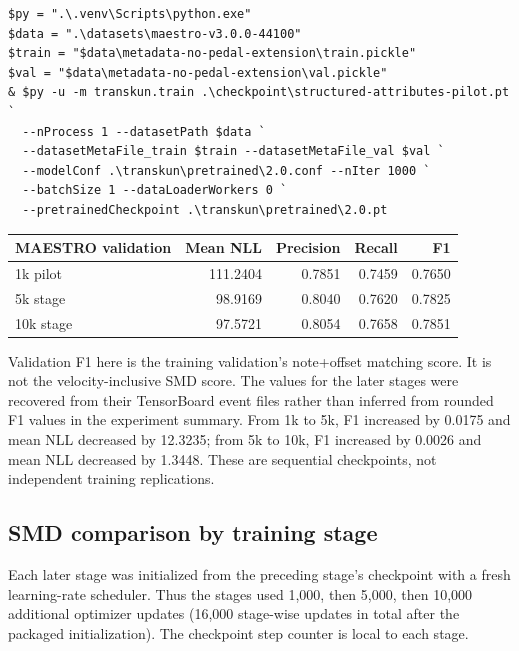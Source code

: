 \documentclass[11pt]{article}
\begin{document}
\begin{verbatim}
$py = ".\.venv\Scripts\python.exe"
$data = ".\datasets\maestro-v3.0.0-44100"
$train = "$data\metadata-no-pedal-extension\train.pickle"
$val = "$data\metadata-no-pedal-extension\val.pickle"
& $py -u -m transkun.train .\checkpoint\structured-attributes-pilot.pt `
  --nProcess 1 --datasetPath $data `
  --datasetMetaFile_train $train --datasetMetaFile_val $val `
  --modelConf .\transkun\pretrained\2.0.conf --nIter 1000 `
  --batchSize 1 --dataLoaderWorkers 0 `
  --pretrainedCheckpoint .\transkun\pretrained\2.0.pt
\end{verbatim}

\begin{center}
\begin{tabular}{lrrrr}
\toprule
\textbf{MAESTRO validation} & \textbf{Mean NLL} & \textbf{Precision} &
\textbf{Recall} & \textbf{F1} \\
\midrule
1k pilot & 111.2404 & 0.7851 & 0.7459 & 0.7650 \\
5k stage & 98.9169 & 0.8040 & 0.7620 & 0.7825 \\
10k stage & 97.5721 & 0.8054 & 0.7658 & 0.7851 \\
\bottomrule
\end{tabular}
\end{center}

Validation F1 here is the training validation's note+offset matching score.
It is not the velocity-inclusive SMD score. The values for the later stages
were recovered from their TensorBoard event files rather than inferred from
rounded F1 values in the experiment summary. From 1k to 5k, F1 increased by
0.0175 and mean NLL decreased by 12.3235; from 5k to 10k, F1 increased by
0.0026 and mean NLL decreased by 1.3448. These are sequential checkpoints,
not independent training replications.

\subsection{SMD comparison by training stage}

Each later stage was initialized from the preceding stage's checkpoint with
a fresh learning-rate scheduler. Thus the stages used 1,000, then 5,000,
then 10,000 additional optimizer updates (16,000 stage-wise updates in total
after the packaged initialization). The checkpoint step counter is local to
each stage.
\end{document}

